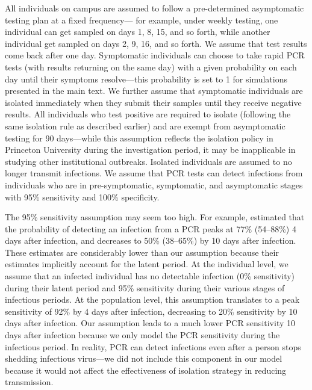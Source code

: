 \documentclass[12pt]{article}
\begin{document}
All individuals on campus are assumed to follow a pre-determined asymptomatic testing plan at a fixed frequency---
for example, under weekly testing, one individual can get sampled on days 1, 8, 15, and so forth, while another individual get sampled on days 2, 9, 16, and so forth.
We assume that test results come back after one day.
Symptomatic individuals can choose to take rapid PCR tests (with results returning on the same day) with a given probability on each day until their symptoms resolve---this probability is set to 1 for simulations presented in the main text.
We further assume that symptomatic individuals are isolated immediately when they submit their samples until they receive negative results.
All individuals who test positive are required to isolate (following the same isolation rule as described earlier) and are exempt from asymptomatic testing for 90 days---while this assumption reflects the isolation policy in Princeton University during the investigation period, it may be inapplicable in studying other institutional outbreaks.
Isolated individuals are assumed to no longer transmit infections.
We assume that PCR tests can detect infections from individuals who are in pre-symptomatic, symptomatic, and asymptomatic stages with 95\% sensitivity and 100\% specificity.

The 95\% sensitivity assumption may seem too high. 
For example, \cite{hellewell2021estimating} estimated that the probability of detecting an infection from a PCR peaks at 77\% (54–88\%) 4 days after infection, and decreases to 50\% (38–65\%) by 10 days after infection.
These estimates are considerably lower than our assumption because their estimates implicitly account for the latent period.
At the individual level, we assume that an infected individual has no detectable infection (0\% sensitivity) during their latent period and 95\% sensitivity during their various stages of infectious periods.
At the population level, this assumption translates to a peak sensitivity of 92\% by 4 days after infection, decreasing to 20\% sensitivity by 10 days after infection.
Our assumption leads to a much lower PCR sensitivity 10 days after infection because we only model the PCR sensitivity during the infectious period.
In reality, PCR can detect infections even after a person stops shedding infectious virus---we did not include this component in our model because it would not affect the effectiveness of isolation strategy in reducing transmission.
\end{document}
